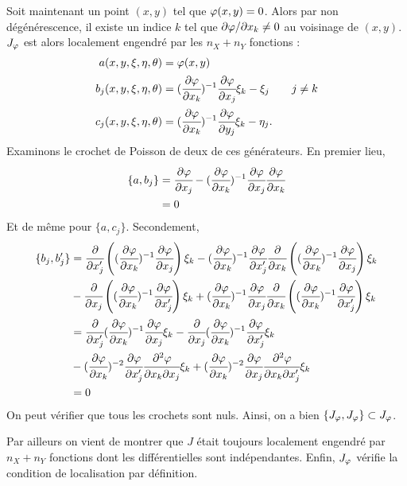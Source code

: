 \begin{preuve}
	Soit maintenant un point $(x,y)$ tel que $\varphi(x,y)=0$. Alors par non dégénérescence, il existe un indice $k$ tel que $\partial \varphi/\partial x_k \neq 0$ au voisinage de $(x,y)$. $J_\varphi$ est alors localement engendré par les $n_X+n_Y$ fonctions :
	\begin{align*}
		a(x,y,\xi,\eta,\theta)&=\varphi(x,y)\\
		b_j(x,y,\xi,\eta,\theta) &= (\cfrac{\partial \varphi}{\partial x_k})^{-1}\cfrac{\partial \varphi}{\partial x_j}\xi_k-\xi_j\qquad j \neq k\\
		c_j(x,y,\xi,\eta,\theta) &= (\cfrac{\partial \varphi}{\partial x_k})^{-1}\cfrac{\partial \varphi}{\partial y_j}\xi_k-\eta_j.
	\end{align*}
	Examinons le crochet de Poisson de deux de ces générateurs. En premier lieu,
	\begin{align*}
		\{a,b_j\} &= \cfrac{\partial \varphi}{\partial x_j} - (\cfrac{\partial \varphi}{\partial x_k})^{-1}\cfrac{\partial \varphi}{\partial x_j} \cfrac{\partial \varphi}{\partial x_k} \\
			&= 0
	\end{align*}
	Et de même pour $\{a,c_j\}$. Secondement,
	\begin{align*}
	\{b_j,b_j'\} &= \cfrac{\partial}{\partial x_j'}\left((\cfrac{\partial \varphi}{\partial x_k})^{-1}\cfrac{\partial \varphi}{\partial x_j}\right)\xi_k
						- (\cfrac{\partial \varphi}{\partial x_k})^{-1}\cfrac{\partial \varphi}{\partial x_j'}\cfrac{\partial}{\partial x_k}\left((\cfrac{\partial \varphi}{\partial x_k})^{-1}\cfrac{\partial \varphi}{\partial x_j}\right)\xi_k\\
					&-\cfrac{\partial}{\partial x_j}\left((\cfrac{\partial \varphi}{\partial x_k})^{-1}\cfrac{\partial \varphi}{\partial x_j'}\right)\xi_k
					+ (\cfrac{\partial \varphi}{\partial x_k})^{-1}\cfrac{\partial \varphi}{\partial x_j}\cfrac{\partial}{\partial x_k}\left((\cfrac{\partial \varphi}{\partial x_k})^{-1}\cfrac{\partial \varphi}{\partial x_j'}\right)\xi_k\\
					&= \cfrac{\partial}{\partial x_j'}(\cfrac{\partial \varphi}{\partial x_k})^{-1}\cfrac{\partial \varphi}{\partial x_j}\xi_k - \cfrac{\partial}{\partial x_j}(\cfrac{\partial \varphi}{\partial x_k})^{-1}\cfrac{\partial \varphi}{\partial x_j'}\xi_k\\
					&- (\cfrac{\partial \varphi}{\partial x_k})^{-2}\cfrac{\partial \varphi}{\partial x_j'}\cfrac{\partial^2\varphi}{\partial x_k\partial x_j}\xi_k + (\cfrac{\partial \varphi}{\partial x_k})^{-2}\cfrac{\partial \varphi}{\partial x_j}\cfrac{\partial^2\varphi}{\partial x_k\partial x_j'}\xi_k\\
					&=0
	\end{align*}
	On peut vérifier que tous les crochets sont nuls. Ainsi, on a bien $\{J_{\varphi},J_{\varphi}\} \subset J_{\varphi}$.
	
	Par ailleurs on vient de montrer que $J$ était toujours localement engendré par $n_X +n_Y$ fonctions dont les différentielles sont indépendantes. Enfin, $J_{\varphi}$ vérifie la condition de localisation par définition.
\end{preuve}
